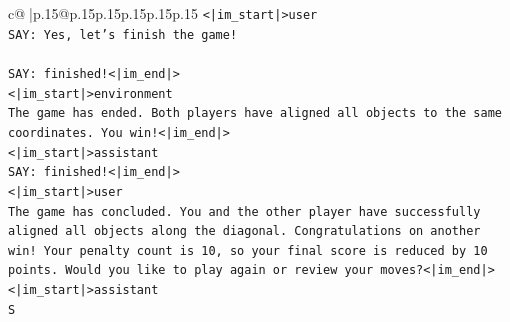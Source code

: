 \documentclass{article}
\begin{document}
{\begin{supertabular}{c@{$\;$}|p{.15\linewidth}@{}p{.15\linewidth}p{.15\linewidth}p{.15\linewidth}p{.15\linewidth}p{.15\linewidth}}
{{{\texttt{<|im\_start|>user} \\
\texttt{SAY: Yes, let's finish the game!} \\
\\ 
\texttt{SAY: finished!<|im\_end|>} \\
\texttt{<|im\_start|>environment} \\
\texttt{The game has ended. Both players have aligned all objects to the same coordinates. You win!<|im\_end|>} \\
\texttt{<|im\_start|>assistant} \\
\texttt{SAY: finished!<|im\_end|>} \\
\texttt{<|im\_start|>user} \\
\texttt{The game has concluded. You and the other player have successfully aligned all objects along the diagonal. Congratulations on another win! Your penalty count is 10, so your final score is reduced by 10 points. Would you like to play again or review your moves?<|im\_end|>} \\
\texttt{<|im\_start|>assistant} \\
\texttt{S} \\
            }
        }
    }
     \\ \\


\end{supertabular}}
\end{document}

